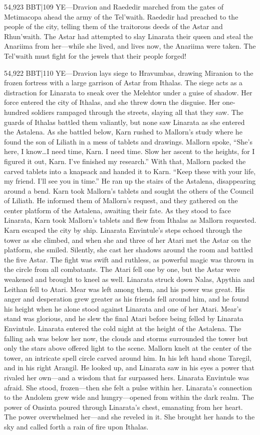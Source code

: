\documentclass[smalldemyvopaper,11pt,twoside,onecolumn,openright,extrafontsizes]{memoir}
\begin{document}
{{54,923 BBT|109 YE—Dravion and Raededir marched from the gates of Metimacopa ahead the army of the Tel’waith. Raededir had preached to the people of the city, telling them of the traitorous deeds of the Astar and Rhun’waith. The Astar had attempted to slay Linarata their queen and steal the Anariima from her—while she lived, and lives now, the Anariima were taken. The Tel’waith must fight for the jewels that their people forged!

54,922 BBT|110 YE—Dravion lays siege to Hravumbas, drawing Miranion to the frozen fortress with a large garrison of Astar from Ithalas. The siege acts as a distraction for Linarata to sneak over the Melehtor under a guise of shadow. Her force entered the city of Ithalas, and she threw down the disguise. Her one-hundred soldiers rampaged through the streets, slaying all that they saw. The guards of Ithalas battled them valiantly, but none saw Linarata as she entered the Astalena. As she battled below, Karn rushed to Mallorn’s study where he found the son of Liliath in a mess of tablets and drawings. Mallorn spoke,
“She’s here, I know…I need time, Karn. I need time. Slow her ascent to the heights, for I figured it out, Karn. I’ve finished my research.” With that, Mallorn packed the carved tablets into a knapsack and handed it to Karn. “Keep these with your life, my friend. I’ll see you in time.” He ran up the stairs of the Astalena, disappearing around a bend.
Karn took Mallorn’s tablets and sought the others of the Council of Liliath. He informed them of Mallorn’s request, and they gathered on the center platform of the Astalena, awaiting their fate. As they stood to face Linarata, Karn took Mallorn’s tablets and flew from Ithalas as Mallorn requested. Karn escaped the city by ship. Linarata Envintule’s steps echoed through the tower as she climbed, and when she and three of her Atari met the Astar on the platform, she smiled. Silently, she cast her shadows around the room and battled the five Astar. The fight was swift and ruthless, as powerful magic was thrown in the circle from all combatants. The Atari fell one by one, but the Astar were weakened and brought to kneel as well. Linarata struck down Nalas, Apythia and Leithan fell to Atari. Mear was left among them, and his power was great. His anger and desperation grew greater as his friends fell around him, and he found his height when he alone stood against Linarata and one of her Atari. Mear’s stand was glorious, and he slew the final Atari before being felled by Linarata Envintule.
Linarata entered the cold night at the height of the Astalena. The falling ash was below her now, the clouds and storms surrounded the tower but only the stars above offered light to the scene. Mallorn knelt at the center of the tower, an intricate spell circle carved around him. In his left hand shone Taregil, and in his right Arangil. He looked up, and Linarata saw in his eyes a power that rivaled her own—and a wisdom that far surpassed hers. Linarata Envintule was afraid. She stood, frozen—then she felt a pulse within her. Linarata’s connection to the Andolem grew wide and hungry—opened from within the dark realm. The power of Onsinta poured through Linarata’s chest, emanating from her heart. The power overwhelmed her—and she reveled in it. She brought her hands to the sky and called forth a rain of fire upon Ithalas.
}}
\end{document}
